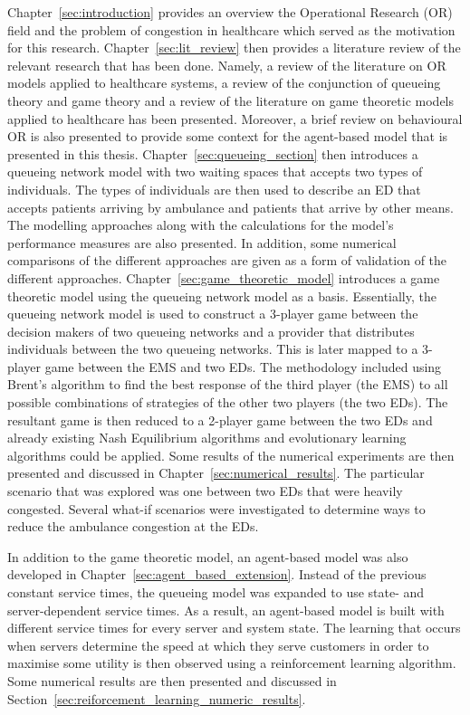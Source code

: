 Chapter~\ref{sec:introduction} provides an overview the Operational Research
(OR) field and the problem of congestion in healthcare which served as the
motivation for this research.
Chapter~\ref{sec:lit_review} then provides a literature review of the
relevant research that has been done.
Namely, a review of the literature on OR models applied to healthcare
systems, a review of the conjunction of queueing theory and game theory and a
review of the literature on game theoretic models applied to healthcare has
been presented.
Moreover, a brief review on behavioural OR is also presented to provide some
context for the agent-based model that is presented in this thesis.
Chapter~\ref{sec:queueing_section} then introduces a queueing network model
with two waiting spaces that accepts two types of individuals.
The types of individuals are then used to describe an ED that accepts
patients arriving by ambulance and patients that arrive by other means.
The modelling approaches along with the calculations for the model's
performance measures are also presented.
In addition, some numerical comparisons of the different approaches are
given as a form of validation of the different approaches.
Chapter~\ref{sec:game_theoretic_model} introduces a game theoretic model
using the queueing network model as a basis.
Essentially, the queueing network model is used to construct a 3-player game
between the decision makers of two queueing networks and a provider that
distributes individuals between the two queueing networks.
This is later mapped to a 3-player game between the EMS and two EDs.
The methodology included using Brent's algorithm to find the best response of
the third player (the EMS) to all possible combinations of strategies of the
other two players (the two EDs).
The resultant game is then reduced to a 2-player game between the two EDs
and already existing Nash Equilibrium algorithms and evolutionary learning
algorithms could be applied.
Some results of the numerical experiments are then presented and discussed in
Chapter~\ref{sec:numerical_results}.
The particular scenario that was explored was one between two EDs that
were heavily congested.
Several what-if scenarios were investigated to determine ways to reduce the
ambulance congestion at the EDs.

In addition to the game theoretic model, an agent-based model was also
developed in Chapter~\ref{sec:agent_based_extension}.
Instead of the previous constant service times, the queueing model was expanded
to use state- and server-dependent service times.
As a result, an agent-based model is built with different service times for
every server and system state.
The learning that occurs when servers determine the speed at which they serve
customers in order to maximise some utility is then observed using a
reinforcement learning algorithm.
Some numerical results are then presented and discussed in
Section~\ref{sec:reiforcement_learning_numeric_results}.

